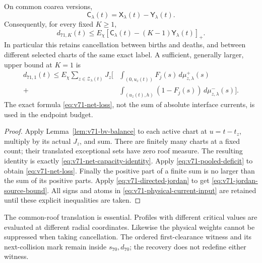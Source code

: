 \begin{theorem}
\label{thm:v71-net-current}
On common coarea versions,
\begin{equation}\label{eq:v71-net-capacity-identity}
 \mathsf C_\lambda(t)=\mathsf X_\lambda(t)-\mathsf Y_\lambda(t).
\end{equation}
Consequently, for every fixed $K\ge1$,
\begin{equation}\label{eq:v71-net-loss}
 d_{71,K}(t)\le E_\chi
       [\mathsf C_\lambda(t)-(K-1)\mathsf Y_\lambda(t)]_+.
\end{equation}
In particular this retains cancellation between births and deaths,
and between different selected charts of the same exact label. A
sufficient, generally larger, upper bound at $K=1$ is
\begin{equation}\label{eq:v71-jordan-source-bound}
 \begin{split}
 d_{71,1}(t)\le E_\chi
 \sum_{z\in\mathcal Z_\lambda(t)}J_z\bigg[
       &\int_{(0,u_z(t))}F_j(s)\,d\mu_{z,\lambda}^+(s)\\
       +&\int_{(u_z(t),h)}(1-F_j(s))\,d\mu_{z,\lambda}^-(s)
                                                    \bigg].
 \end{split}
\end{equation}
The exact formula \eqref{eq:v71-net-loss}, not the sum of absolute
interface currents, is used in the endpoint budget.
\end{theorem}
\begin{proof}
Apply Lemma~\ref{lem:v71-bv-balance} to each active chart at
$u=t-t_z$, multiply by its actual $J_z$, and sum. There are
finitely many charts at a fixed count; their translated exceptional
sets have zero roof measure. The resulting identity is exactly
\eqref{eq:v71-net-capacity-identity}. Apply
\eqref{eq:v71-pooled-deficit} to obtain \eqref{eq:v71-net-loss}.
Finally the positive part of a finite sum is no larger than the sum
of its positive parts. Apply \eqref{eq:v71-directed-jordan} to
get \eqref{eq:v71-jordan-source-bound}. All signs and atoms in
\eqref{eq:v71-physical-current-input} are retained until these
explicit inequalities are taken.
\end{proof}

The common-roof translation is essential. Profiles with different
critical values are evaluated at different radial coordinates. Likewise
the physical weights cannot be suppressed when taking cancellation.
The ordered first-clearance witness and its next-collision mark remain
inside $s_{70},d_{70}$; the recovery does not redefine either witness.

